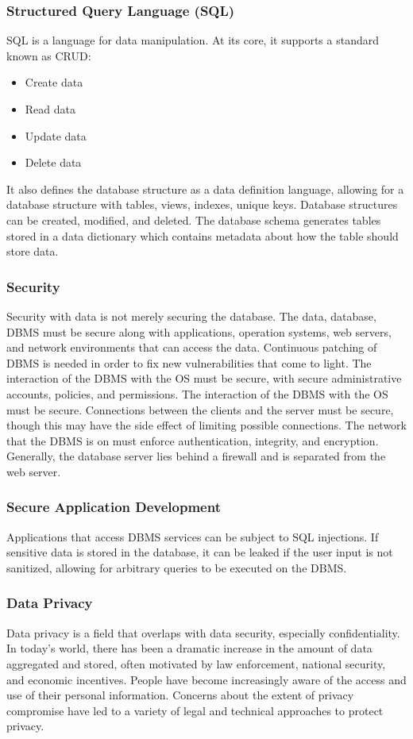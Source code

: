 \documentclass{math}
\begin{document}
\subsubsection*{Structured Query Language (SQL)}
SQL is a language for data manipulation. At its core, it supports a standard
known as CRUD:
\begin{itemize}
  \item Create data
  \item Read data
  \item Update data
  \item Delete data
\end{itemize}
It also defines the database structure as a data definition language, allowing
for a database structure with tables, views, indexes, unique keys. Database
structures can be created, modified, and deleted. The database schema generates
tables stored in a data dictionary which contains metadata about how the table
should store data.

\subsubsection*{Security}
Security with data is not merely securing the database. The data, database,
DBMS must be secure along with applications, operation systems, web servers,
and network environments that can access the data. Continuous patching of DBMS
is needed in order to fix new vulnerabilities that come to light. The
interaction of the DBMS with the OS must be secure, with secure administrative
accounts, policies, and permissions. The interaction of the DBMS with the OS
must be secure. Connections between the clients and the server must be secure,
though this may have the side effect of limiting possible connections. The
network that the DBMS is on must enforce authentication, integrity, and
encryption. Generally, the database server lies behind a firewall and is
separated from the web server.

\subsubsection*{Secure Application Development}
Applications that access DBMS services can be subject to SQL injections. If
sensitive data is stored in the database, it can be leaked if the user input
is not sanitized, allowing for arbitrary queries to be executed on the DBMS.

\subsubsection*{Data Privacy}
Data privacy is a field that overlaps with data security, especially
confidentiality. In today's world, there has been a dramatic increase in the
amount of data aggregated and stored, often motivated by law enforcement,
national security, and economic incentives. People have become increasingly
aware of the access and use of their personal information. Concerns about the
extent of privacy compromise have led to a variety of legal and technical
approaches to protect privacy.
\end{document}
